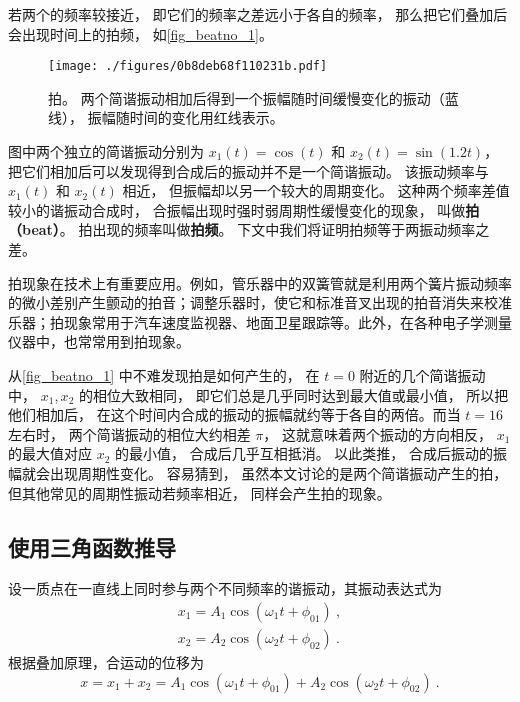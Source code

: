 

若两个的频率较接近， 即它们的频率之差远小于各自的频率， 那么把它们叠加后会出现时间上的拍频， 如\autoref{fig_beatno_1}。
\begin{figure}[ht]
\centering
\texttt{[image: ./figures/0b8deb68f110231b.pdf]}
\caption{拍。 两个简谐振动相加后得到一个振幅随时间缓慢变化的振动（蓝线）， 振幅随时间的变化用红线表示。} \label{fig_beatno_1}
\end{figure}
图中两个独立的简谐振动分别为 $x_1(t) = \cos(t)$ 和 $x_2(t) = \sin(1.2t)$， 把它们相加后可以发现得到合成后的振动并不是一个简谐振动。 该振动频率与 $x_1(t)$ 和 $x_2(t)$ 相近， 但振幅却以另一个较大的周期变化。 这种两个频率差值较小的谐振动合成时， 合振幅出现时强时弱周期性缓慢变化的现象， 叫做\textbf{拍（beat）}。 拍出现的频率叫做\textbf{拍频}。 下文中我们将证明拍频等于两振动频率之差。

拍现象在技术上有重要应用。例如，管乐器中的双簧管就是利用两个簧片振动频率的微小差别产生颤动的拍音；调整乐器时，使它和标准音叉出现的拍音消失来校准乐器；拍现象常用于汽车速度监视器、地面卫星跟踪等。此外，在各种电子学测量仪器中，也常常用到拍现象。

从\autoref{fig_beatno_1} 中不难发现拍是如何产生的， 在 $t = 0$ 附近的几个简谐振动中， $x_1, x_2$ 的相位大致相同， 即它们总是几乎同时达到最大值或最小值， 所以把他们相加后， 在这个时间内合成的振动的振幅就约等于各自的两倍。而当 $t = 16$ 左右时， 两个简谐振动的相位大约相差 $\pi$， 这就意味着两个振动的方向相反， $x_1$ 的最大值对应 $x_2$ 的最小值， 合成后几乎互相抵消。 以此类推， 合成后振动的振幅就会出现周期性变化。
容易猜到， 虽然本文讨论的是两个简谐振动产生的拍， 但其他常见的周期性振动若频率相近， 同样会产生拍的现象。

\subsection{使用三角函数推导}
设一质点在一直线上同时参与两个不同频率的谐振动，其振动表达式为
\begin{equation}
\begin{array}{l}x_{1}=A_{1} \cos \left(\omega_{1} t+\phi_{01}\right) ~,\\ x_{2}=A_{2} \cos \left(\omega_{2} t+\phi_{02}\right)~.\end{array}
\end{equation}
根据叠加原理，合运动的位移为
\begin{equation}
x=x_{1}+x_{2}=A_{1} \cos \left(\omega_{1} t+\phi_{01}\right)+A_{2} \cos \left(\omega_{2} t+\phi_{02}\right)~.
\end{equation}


